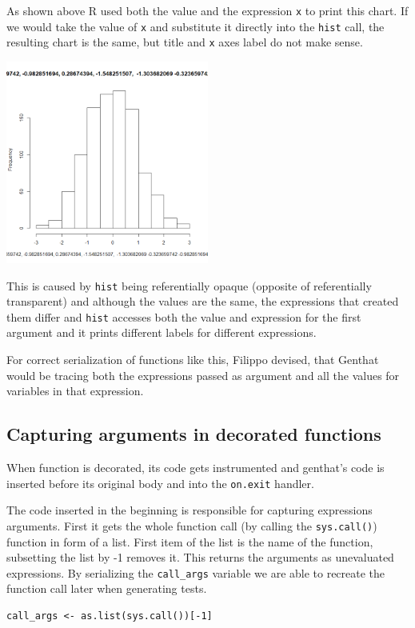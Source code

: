 \documentclass[thesis=B,english]{FITthesis}[2012/10/20]
\begin{document}
As shown above R used both the value and the expression \verb|x| to print this chart. If we would take the value of \verb|x| and substitute it directly into the \verb|hist| call, the resulting chart is the same, but title and \verb|x| axes label do not make sense.

\includegraphics[width=0.5\textwidth]{img/hist2.png}

This is caused by \verb|hist| being referentially opaque (opposite of referentially transparent) and although the values are the same, the expressions that created them differ and \verb|hist| accesses both the value and expression for the first argument and it prints different labels for different expressions.

For correct serialization of functions like this, Filippo devised, that Genthat would be tracing both the expressions passed as argument and all the values for variables in that expression.

\subsection{Capturing arguments in decorated functions}
When function is decorated, its code gets instrumented and genthat’s code is inserted before its original body and into the \verb|on.exit| handler.

The code inserted in the beginning is responsible for capturing expressions arguments. First it gets the whole function call (by calling the \verb|sys.call()|) function in form of a list. First item of the list is the name of the function, subsetting the list by -1 removes it. This returns the arguments as unevaluated expressions. By serializing the \verb|call_args| variable we are able to recreate the function call later when generating tests.

\begin{verbatim}
call_args <- as.list(sys.call())[-1]
\end{verbatim}
\end{document}
